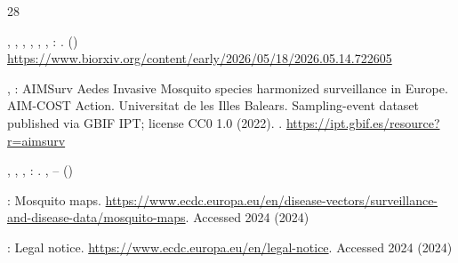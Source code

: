 \documentclass[11pt]{article}
\begin{document}
\begin{thebibliography}{28}
\begin{barticle}
,
,
,
,
,
,
:
.
()
\url{https://www.biorxiv.org/content/early/2026/05/18/2026.05.14.722605}
\end{barticle}
\endbibitem

\begin{botherref}
,
:
{AIMSurv Aedes Invasive Mosquito species harmonized surveillance in Europe. AIM-COST Action}.
Universitat de les Illes Balears.
Sampling-event dataset published via GBIF IPT; license CC0 1.0
(2022).
 .
\url{https://ipt.gbif.es/resource?r=aimsurv}
\end{botherref}
\endbibitem

\begin{barticle}
,
,
, \betal:
.
,
--
()
\end{barticle}
\endbibitem

\begin{botherref}
:
Mosquito maps.
\url{https://www.ecdc.europa.eu/en/disease-vectors/surveillance-and-disease-data/mosquito-maps}.
Accessed 2024
(2024)
\end{botherref}
\endbibitem

\begin{botherref}
:
Legal notice.
\url{https://www.ecdc.europa.eu/en/legal-notice}.
Accessed 2024
(2024)
\end{botherref}
\endbibitem


\end{thebibliography}
\end{document}
